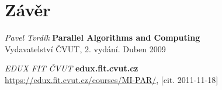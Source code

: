 \documentclass[]{article}
\begin{document}
\section{Závěr}

\newpage
\begin{thebibliography}{9}

{\em Pavel Tvrdík}
       {\bf Parallel Algorithms and Computing}\\
		Vydavatelství ČVUT, 2. vydání. Duben 2009

{\em EDUX FIT ČVUT}
       {\bf edux.fit.cvut.cz}\\
       \url{https://edux.fit.cvut.cz/courses/MI-PAR/}, [cit. 2011-11-18]
       
 \end{thebibliography}
\end{document}
